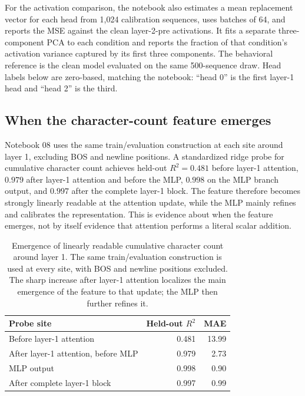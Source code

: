 \documentclass[11pt]{article}
\begin{document}
For the activation comparison, the notebook also estimates a mean replacement
vector for each head from 1,024 calibration sequences, uses batches of 64, and
reports the MSE against the clean layer-2-pre activations.  It fits a separate
three-component PCA to each condition and reports the fraction of that
condition's activation variance captured by its first three components.  The
behavioral reference is the clean model evaluated on the same 500-sequence
draw.  Head labels below are zero-based, matching the notebook: ``head 0''
is the first layer-1 head and ``head 2'' is the third.

\subsection{When the character-count feature emerges}

Notebook 08 uses the same train/evaluation construction at each site around
layer 1, excluding BOS and newline positions. A standardized ridge probe for
cumulative character count achieves held-out $R^2=0.481$ before layer-1
attention, $0.979$ after layer-1 attention and before the MLP, $0.998$ on the
MLP branch output, and $0.997$ after the complete layer-1 block. The feature
therefore becomes strongly linearly readable at the attention update, while
the MLP mainly refines and calibrates the representation. This is evidence
about when the feature emerges, not by itself evidence that attention performs
a literal scalar addition.

\begin{table}[t]
\centering
\small
\begin{tabular}{lrr}
\toprule
Probe site & Held-out $R^2$ & MAE \\
\midrule
Before layer-1 attention & 0.481 & 13.99 \\
After layer-1 attention, before MLP & 0.979 & 2.73 \\
MLP output & 0.998 & 0.90 \\
After complete layer-1 block & 0.997 & 0.99 \\
\bottomrule
\end{tabular}
\caption{Emergence of linearly readable cumulative character count around
layer 1. The same train/evaluation construction is used at every site, with
BOS and newline positions excluded. The sharp increase after layer-1
attention localizes the main emergence of the feature to that update; the
MLP then further refines it.}
\label{tab:layer1-count-emergence}
\end{table}
\end{document}
